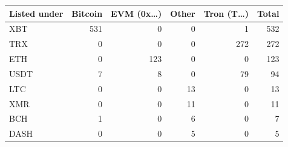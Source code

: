 \begin{tabular}{lrrrrr}
\toprule
Listed under & Bitcoin & EVM (0x\ldots{}) & Other & Tron (T\ldots{}) & Total \\
\midrule
XBT & 531 & 0 & 0 & 1 & 532 \\
TRX & 0 & 0 & 0 & 272 & 272 \\
ETH & 0 & 123 & 0 & 0 & 123 \\
USDT & 7 & 8 & 0 & 79 & 94 \\
LTC & 0 & 0 & 13 & 0 & 13 \\
XMR & 0 & 0 & 11 & 0 & 11 \\
BCH & 1 & 0 & 6 & 0 & 7 \\
DASH & 0 & 0 & 5 & 0 & 5 \\
\bottomrule
\end{tabular}